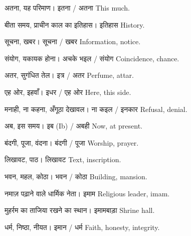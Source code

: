 %
{अतना, यह परिमाण।}%
{इतना / अतना}%
{This much.}

%
{बीता समय, प्राचीन काल का इतिहास।}%
{इतिहास}%
{History.}

%
{सूचना, खबर।}%
{सूचना / खबर}%
{Information, notice.}

%
{संयोग, यकायक होना।}%
{अचके भइल / संयोग}%
{Coincidence, chance.}

%
{अतर, सुगंधित तेल।}%
{इत्र / अतर}%
{Perfume, attar.}

%
{एह ओर, इहवाँ।}%
{इधर / एह ओर}%
{Here, this side.}

%
{मनाही, ना कहना, अँगूठा देखावल।}%
{ना कइल / इनकार}%
{Refusal, denial.}

%
{अब, इस समय।}%
{इब (Ib) / अबही}%
{Now, at present.}

%
{बंदगी, पूजा, वंदना।}%
{बंदगी / पूजा}%
{Worship, prayer.}

%
{लिखावट, पाठ।}%
{लिखावट}%
{Text, inscription.}

%
{भवन, महल, कोठा।}%
{भवन / कोठा}%
{Building, mansion.}

%
{नमाज़ पढ़ाने वाले धार्मिक नेता।}%
{इमाम}%
{Religious leader, imam.}

%
{मुहर्रम का ताजिया रखने का स्थान।}%
{इमामबाड़ा}%
{Shrine hall.}

%
{धर्म, निष्ठा, नीयत।}%
{इमान / धर्म}%
{Faith, honesty, integrity.}

